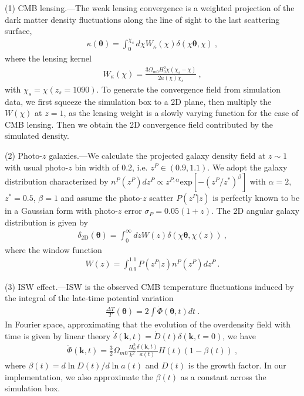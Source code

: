 \documentclass[aps,prl,twocolumn,showpacs,superscriptaddress,groupedaddress,nofootinbib]{revtex4}  %
\newcommand{\mr}{\mathrm}
\begin{document}

(1) CMB lensing.---The weak lensing convergence is a weighted projection
of the dark matter density fluctuations along the line of sight to the last 
scattering surface,
\begin{eqnarray}
\kappa(\bm{\theta})=\int_0^{\chi_s}d\chi 
W_\kappa(\chi)\delta(\chi\bm{\theta},\chi)\ ,
\end{eqnarray}
where the lensing kernel
\begin{eqnarray}
W_\kappa(\chi)=\frac{3\Omega_{m0}H_0^2\chi(\chi_s-\chi)}{2a(\chi)\chi_s}\ ,
\end{eqnarray}
with $\chi_s=\chi(z_s=1090)$.
To generate the convergence field from simulation data, we first squeeze the 
simulation box to a 2D plane, then multiply the $W(\chi)$ at $z=1$, as the 
lensing weight is a slowly varying function for the case of CMB lensing.
Then we obtain the 2D convergence field contributed by the simulated density.

(2) Photo-$z$ galaxies.---We calculate the projected galaxy density field 
at $z\sim 1$ with usual photo-$z$ bin width of $0.2$, i.e. $z^P\in(0.9,1.1)$. 
We adopt the galaxy distribution characterized by 
$n^P(z^P)dz^P\propto z^{P,\alpha}\mr{exp}[-(z^P/z^{*})^\beta]$
with $\alpha=2$, $z^*=0.5$, $\beta=1$
and assume the photo-$z$ scatter $P(z^P|z)$ is perfectly known to be in a Gaussian form with photo-$z$ error $\sigma_P=0.05(1+z)$.
The 2D angular galaxy distribution is given by
\begin{eqnarray}
\delta_\mr{2D}(\bm{\theta})=\int_0^\infty dzW(z)
\delta(\chi\bm{\theta},\chi(z))\ ,
\end{eqnarray}
where the window function 
\begin{eqnarray}
W(z)=\int_{0.9}^{1.1}P(z^P|z) n^P(z^P) dz^P\ . 
\end{eqnarray}

(3) ISW effect.---ISW is the observed CMB temperature fluctuations induced by the integral of the late-time potential variation
\begin{eqnarray}
\frac{\Delta T}{T}(\bm\theta)=2\int \dot\Phi(\bm{\theta},t)dt\ .
\end{eqnarray}
In Fourier space, approximating that the evolution of the overdensity field with time is given by linear theory
$\dot\delta(\bm{k},t)=\dot D(t)\delta(\bm{k},t=0)$, we have
\begin{eqnarray}
\dot\Phi(\bm{k},t)=\frac{3}{2}\Omega_{m0}\frac{H_0^2}{k^2}\frac{\delta(\bm{k},t)}{a(t)}H(t)(1-\beta(t))\ ,
\end{eqnarray}
where $\beta(t)=d\ln D(t)/d\ln a(t)$ and $D(t)$ is the growth factor.
In our implementation, we also approximate the $\beta(t)$ as a constant across the simulation box.
\end{document}
